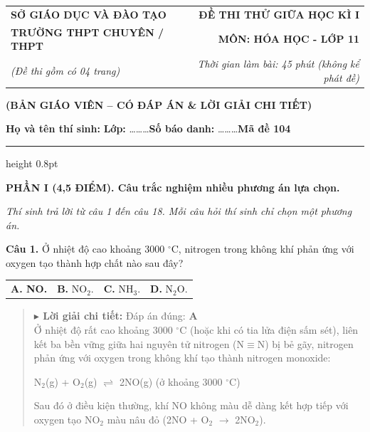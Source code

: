 \documentclass[11pt,a4paper]{article}
\begin{document}
\begin{tabularx}{\textwidth}{@{}l X r@{}}
\textbf{\small SỞ GIÁO DỤC VÀ ĐÀO TẠO} & & \textbf{\small ĐỀ THI THỬ GIỮA HỌC KÌ I} \\
\textbf{\normalsize TRƯỜNG THPT CHUYÊN / THPT} & & \textbf{\normalsize MÔN: HÓA HỌC - LỚP 11} \\
\textit{\small (Đề thi gồm có 04 trang)} & & \textit{\small Thời gian làm bài: 45 phút (không kể phát đề)}
\end{tabularx}

\begin{center}
{\color{red!80!black}\textbf{(BẢN GIÁO VIÊN -- CÓ ĐÁP ÁN \& LỜI GIẢI CHI TIẾT)}}\par\vspace{3pt}
\textbf{Họ và tên thí sinh:} \dotfill \quad \textbf{Lớp:} \dots\dots\dots \quad \textbf{Số báo danh:} \dots\dots\dots \hfill \textbf{\large Mã đề 104}
\end{center}
\vspace{-4pt}
{\color{gray!50}\hrule height 0.8pt}
\vspace{6pt}

{\color{myGreen}\bfseries\large PHẦN I (4,5 ĐIỂM). Câu trắc nghiệm nhiều phương án lựa chọn.}

\textit{\small Thí sinh trả lời từ câu 1 đến câu 18. Mỗi câu hỏi thí sinh chỉ chọn một phương án.}
\vspace{3pt}

\textbf{Câu 1.} Ở nhiệt độ cao khoảng 3000 $^\circ\text{C}$, nitrogen trong không khí phản ứng với oxygen tạo thành hợp chất nào sau đây?

\begin{tabularx}{\textwidth}{@{}XXXX@{}}
\textbf{\color{red} A. NO.} & \textbf{B.} NO$_{2}$. & \textbf{C.} NH$_{3}$. & \textbf{D.} N$_{2}$O. \\
\end{tabularx}

\begin{quote}\small
{\color{myBlue}\textbf{$\blacktriangleright$ Lời giải chi tiết:}} Đáp án đúng: \textbf{\color{red} A}\\
Ở nhiệt độ rất cao khoảng 3000 $^\circ\text{C}$ (hoặc khi có tia lửa điện sấm sét), liên kết ba bền vững giữa hai nguyên tử nitrogen (N$\equiv$N) bị bẻ gãy, nitrogen phản ứng với oxygen trong không khí tạo thành nitrogen monoxide:

N$_{2}$(g) + O$_{2}$(g) $\rightleftharpoons$ 2NO(g) (ở khoảng 3000 $^\circ\text{C}$)

Sau đó ở điều kiện thường, khí NO không màu dễ dàng kết hợp tiếp với oxygen tạo NO$_{2}$ màu nâu đỏ (2NO + O$_{2}$ $\longrightarrow$ 2NO$_{2}$).
\end{quote}
\vspace{2pt}
\end{document}
